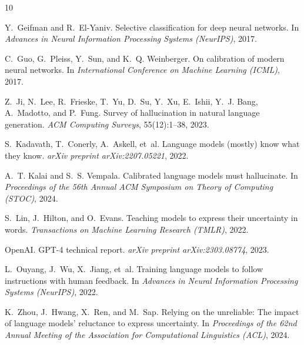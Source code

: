 \documentclass[11pt]{article}
\begin{document}

\begin{thebibliography}{10}

Y.~Geifman and R.~El-Yaniv.
\newblock Selective classification for deep neural networks.
\newblock In \emph{Advances in Neural Information Processing Systems (NeurIPS)}, 2017.

C.~Guo, G.~Pleiss, Y.~Sun, and K.~Q. Weinberger.
\newblock On calibration of modern neural networks.
\newblock In \emph{International Conference on Machine Learning (ICML)}, 2017.

Z.~Ji, N.~Lee, R.~Frieske, T.~Yu, D.~Su, Y.~Xu, E.~Ishii, Y.~J. Bang, A.~Madotto, and P.~Fung.
\newblock Survey of hallucination in natural language generation.
\newblock \emph{ACM Computing Surveys}, 55(12):1--38, 2023.

S.~Kadavath, T.~Conerly, A.~Askell, et~al.
\newblock Language models (mostly) know what they know.
\newblock \emph{arXiv preprint arXiv:2207.05221}, 2022.

A.~T. Kalai and S.~S. Vempala.
\newblock Calibrated language models must hallucinate.
\newblock In \emph{Proceedings of the 56th Annual ACM Symposium on Theory of Computing (STOC)}, 2024.

S.~Lin, J.~Hilton, and O.~Evans.
\newblock Teaching models to express their uncertainty in words.
\newblock \emph{Transactions on Machine Learning Research (TMLR)}, 2022.

OpenAI.
\newblock GPT-4 technical report.
\newblock \emph{arXiv preprint arXiv:2303.08774}, 2023.

L.~Ouyang, J.~Wu, X.~Jiang, et~al.
\newblock Training language models to follow instructions with human feedback.
\newblock In \emph{Advances in Neural Information Processing Systems (NeurIPS)}, 2022.

K.~Zhou, J.~Hwang, X.~Ren, and M.~Sap.
\newblock Relying on the unreliable: The impact of language models' reluctance to express uncertainty.
\newblock In \emph{Proceedings of the 62nd Annual Meeting of the Association for Computational Linguistics (ACL)}, 2024.

\end{thebibliography}
\end{document}
